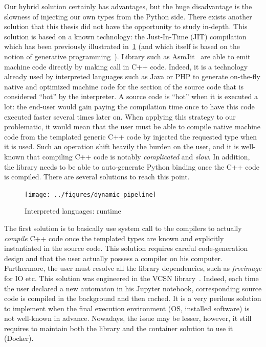 Our hybrid solution certainly has advantages, but the huge disadvantage is the slowness of injecting our own types from
the Python side. There exists another solution that this thesis did not have the opportunity to study in-depth. This
solution is based on a known technology: the Just-In-Time (JIT) compilation which has been previously illustrated
in~\cref{summary:fig:static.dynamic.dynamic.pipeline} (and which itself is based on the notion of generative
programming~\parencite{czarnecki.2000.generative}). Library such as AsmJit~\parencite{kobalicek.2011.asmjit} are able to
emit machine code directly by making call in C++ code. Indeed, it is a technology already used by interpreted languages
such as Java or PHP to generate on-the-fly native and optimized machine code for the section of the source code that is
considered ``hot'' by the interpreter. A source code is ``hot'' when it is executed a lot: the end-user would gain
paying the compilation time once to have this code executed faster several times later on. When applying this strategy
to our problematic, it would mean that the user must be able to compile native machine code from the templated generic
C++ code by injected the requested type when it is used. Such an operation shift heavily the burden on the user, and it
is well-known that compiling C++ code is notably \emph{complicated} and \emph{slow}. In addition, the library needs to
be able to auto-generate Python binding once the C++ code is compiled. There are several solutions to reach this point.

\begin{figure}[htbp]
  \centering
  \texttt{[image: ../figures/dynamic\_pipeline]}
  \caption{Interpreted languages: runtime}
  \label{summary:fig:static.dynamic.dynamic.pipeline}
\end{figure}

The first solution is to basically use system call to the compilers to actually \emph{compile} C++ code once the
templated types are known and explicitly instantiated in the source code. This solution requires careful code-generation
design and that the user actually possess a compiler on his computer. Furthermore, the user must resolve all the library
dependencies, such as \emph{freeimage} for IO etc. This solution was engineered in the VCSN
library~\parencite{demaille.2013.vcsn}. Indeed, each time the user declared a new automaton in his Jupyter notebook,
corresponding source code is compiled in the background and then cached. It is a very perilous solution to implement
when the final execution environment (OS, installed software) is not well-known in advance. Nowadays, the issue may be
lesser, however, it still requires to maintain both the library and the container solution to use it (Docker).

